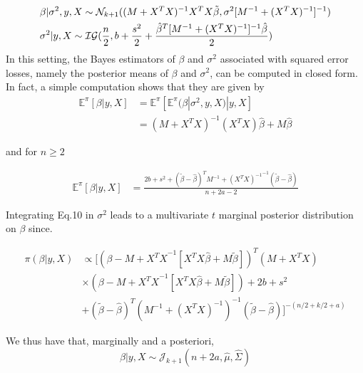 \documentclass{article}
\begin{document}
\begin{equation}
\begin{aligned}
    &\beta|\sigma^{2},y, X \sim \mathcal{N}_{k+1}((M+X^{T}X)^{-1}X^{T}X\Tilde{\beta},\sigma^{2}[M^{-1}+(X^{T}X)^{-1}]^{-1})  \\
    &\sigma^{2} | y,X \sim \mathcal{IG}(\frac{n}{2},b+\frac{s^2}{2}+\frac{\hat{\beta}^{T}[M^{-1}+(X^{T}X)^{-1}]^{-1}\hat{\beta}}{2})
\end{aligned}
\end{equation}
In this setting, the Bayes estimators of $\beta$ and $\sigma^{2}$ associated with squared error losses, namely the posterior means of $\beta$ and $\sigma^{2}$, can be computed in closed form. In fact, a simple computation shows that they are given by
\begin{equation}
\begin{aligned}
    \mathbb{E}^{\pi}[\beta|y,X] &= \mathbb{E}^{\pi}[\mathbb{E}^{\pi}(\beta|\sigma^2,y,X)|y,X] \\
    & = (M+X^{T}X)^{-1}{(X^{T}X)\hat{\beta}+M\hat{\beta}}
\end{aligned}
\end{equation}

and for $n\geq 2$

\begin{equation}
\begin{aligned}
    \mathbb{E}^{\pi}[\beta|y,X] &= \frac{2b+s^{2}+(\tilde{\beta}-\hat{\beta})^{T}{M^{-1}+(X^{T}X)^{-1}}^{-1}(\tilde{\beta}-\hat{\beta})}{n+2a-2}
\end{aligned}
\end{equation}

Integrating Eq.10 in $\sigma^{2}$ leads to a multivariate $t$ marginal posterior distribution on $\beta$ since.

\begin{equation}
\begin{aligned}
\pi(\beta|y,X) & \propto [ (\beta-{M+X^{T}X}^{-1}[{X^{T}X}\hat{\beta}+M\tilde{\beta}])^{T} (M+X^{T}X)  \\
&\times (\beta-{M+X^{T}X}^{-1}[{X^{T}X}\hat{\beta}+M\tilde{\beta}]) +2b+s^2  \\
&+(\tilde{\beta}-\hat{\beta})^{T} (M^{-1}+(X^{T}X)^{-1})^{-1} (\tilde{\beta}-\hat{\beta})
]^{-(n/2+k/2+a)}
\end{aligned}
\end{equation}

We thus have that, marginally and a posteriori,
\begin{equation}
    \beta|y,X \sim \mathcal{J}_{k+1}(n+2a,\hat{\mu},\hat{\Sigma})
\end{equation}
\end{document}
